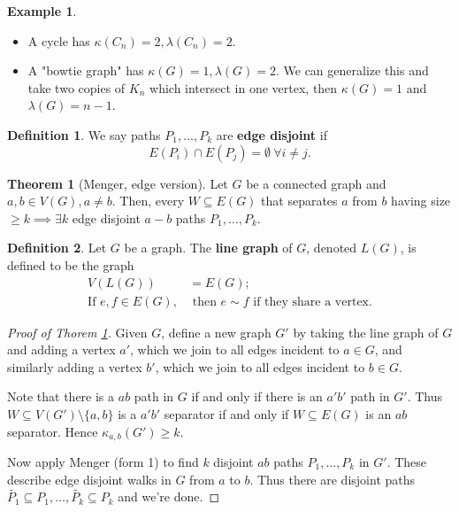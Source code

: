 \documentclass{article}
\theoremstyle{definition}
\newtheorem{theorem}{Theorem}[section]
\newtheorem{example}{Example}[section]
\newtheorem{defn}{Definition}[section]
\begin{document}
\begin{example}
    \begin{itemize}
        \item A cycle has $\kappa(C_n)=2, \lambda(C_n)=2$.
        \item A "bowtie graph" has $\kappa(G)=1, \lambda(G)=2$. We can generalize this and take two copies of $K_n$ which intersect in one vertex, then $\kappa(G)=1$ and $\lambda(G)=n-1$.
    \end{itemize}
\end{example}
\begin{defn}
    We say paths $P_1,\ldots,P_k$ are \textbf{edge disjoint} if $$E(P_i) \cap E(P_j) = \emptyset ~\forall i\neq j.$$
\end{defn}
\begin{theorem}[Menger, edge version]\label{2.7}
    Let $G$ be a connected graph and $a,b \in V(G), a \neq b$. Then, every $W \subseteq E(G)$ that separates $a$ from $b$ having size $\ge k \implies \exists k$ edge disjoint $a-b$ paths $P_1,\ldots,P_k$.
\end{theorem}
\begin{defn}
    Let $G$ be a graph. The \textbf{line graph} of $G$, denoted $L(G)$, is defined to be the graph 
    \begin{align*}
        V(L(G)) &= E(G); \\
        \text{If } e,f \in E(G), &\text{ then } e\sim f \text{ if they share a vertex.}
    \end{align*}
\end{defn}
\begin{proof}[Proof of Thorem \ref{2.7}]
    Given $G$, define a new graph $G'$ by taking the line graph of $G$ and adding a vertex $a'$, which we join to all edges incident to $a \in G$, and similarly adding a vertex $b'$, which we join to all edges incident to $b \in G$.
    \vspace{1mm}
    
    Note that there is a $ab$ path in $G$ if and only if there is an $a'b'$ path in $G'$. Thus $W \subseteq V(G') \setminus \{a,b\}$ is a $a'b'$ separator if and only if $W \subseteq E(G)$ is an $ab$ separator. Hence $\kappa_{a,b}(G')\ge k$.
    \vspace{1mm}
    
    Now apply Menger (form 1) to find $k$ disjoint $ab$ paths $P_1,\ldots,P_k$ in $G'$. These describe edge disjoint walks in $G$ from $a$ to $b$. Thus there are disjoint paths $\tilde{P_1} \subseteq P_1,\ldots,\tilde{P_k} \subseteq P_k$ and we're done.
\end{proof}
\end{document}
